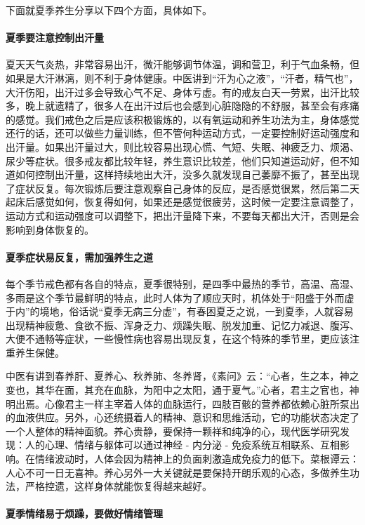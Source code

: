 下面就夏季养生分享以下四个方面，具体如下。

\paragraph{夏季要注意控制出汗量}

夏天天气炎热，非常容易出汗，微汗能够调节体温，调和营卫，利于气血条畅，但如果是大汗淋漓，则不利于身体健康。中医讲到“汗为心之液”，“汗者，精气也”，大汗伤阳，出汗过多会导致心气不足、身体亏虚。有的戒友白天一劳累，出汗比较多，晚上就遗精了，很多人在出汗过后也会感到心脏隐隐的不舒服，甚至会有疼痛的感觉。我们戒色之后是应该积极锻炼的，以有氧运动和养生功法为主，身体感觉还行的话，还可以做些力量训练，但不管何种运动方式，一定要控制好运动强度和出汗量。如果出汗量过大，则比较容易出现心慌、气短、失眠、神疲乏力、烦渴、尿少等症状。很多戒友都比较年轻，养生意识比较差，他们只知道运动好，但不知道如何控制出汗量，这样持续地出大汗，没多久就发现自己萎靡不振了，甚至出现了症状反复。每次锻炼后要注意观察自己身体的反应，是否感觉很累，然后第二天起床后感觉如何，恢复得如何，如果还是感觉很疲劳，这时候一定要注意调整了，运动方式和运动强度可以调整下，把出汗量降下来，不要每天都出大汗，否则是会影响到身体恢复的。

\paragraph{夏季症状易反复，需加强养生之道}

每个季节戒色都有各自的特点，夏季很特别，是四季中最热的季节，高温、高湿、多雨是这个季节最鲜明的特点，此时人体为了顺应天时，机体处于“阳盛于外而虚于内”的境地，俗话说“夏季无病三分虚”，有春困夏乏之说，一到夏季，人就容易出现精神疲惫、食欲不振、浑身乏力、烦躁失眠、脱发加重、记忆力减退、腹泻、大便不通畅等症状，一些慢性病也容易出现反复，在这个特殊的季节里，更应该注重养生保健。

中医有讲到春养肝、夏养心、秋养肺、冬养肾，《素问》云：“心者，生之本，神之变也，其华在面，其充在血脉，为阳中之太阳，通于夏气。”心者，君主之官也，神明出焉。心像君主一样主宰着人体的血脉运行，四肢百骸的营养都依赖心脏所泵出的血液供应。另外，心还统摄着人的精神、意识和思维活动，它的功能状态决定了一个人整体的精神面貌。养心贵静，要保持一颗祥和纯净的心，现代医学研究发现：人的心理、情绪与躯体可以通过神经 - 内分泌 - 免疫系统互相联系、互相影响。在情绪波动时，人体会因为精神上的负面刺激造成免疫力的低下。菜根谭云：人心不可一日无喜神。养心另外一大关键就是要保持开朗乐观的心态，多做养生功法，严格控遗，这样身体就能恢复得越来越好。

\paragraph{夏季情绪易于烦躁，要做好情绪管理}

